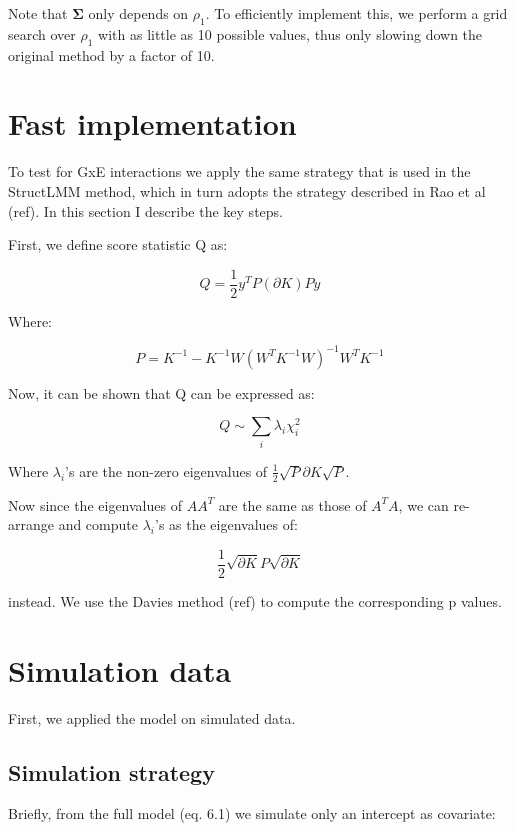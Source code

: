 Note that $\boldsymbol{\Sigma}$ only depends on $\rho_1$. 
To efficiently implement this, we perform a grid search over $\rho_1$ with as little as 10 possible values, thus only slowing down the original method by a factor of 10.

\section{Fast implementation}

To test for GxE interactions we apply the same strategy that is used in the StructLMM method, which in turn adopts the strategy described in Rao et al (ref).
In this section I describe the key steps.

First, we define score statistic Q as:

\begin{equation}
    Q = \frac{1}{2}y^TP (\partial K)P y 
\end{equation}

Where:

\begin{equation}
    P = K^{-1}-K^{-1}W(W^TK^{-1}W)^{-1}W^TK^{-1}
\end{equation}

Now, it can be shown that Q can be expressed as:

\begin{equation}
    Q \sim \sum_i \lambda_i \chi^2_i 
\end{equation}

Where $\lambda_i$'s are the non-zero eigenvalues of $\frac{1}{2}\sqrt{P} \partial K \sqrt{P}$.

Now since the eigenvalues of $AA^T$ are the same as those of $A^TA$, we can re-arrange and compute $\lambda_i$'s as the eigenvalues of:

\begin{equation}
    \frac{1}{2}\sqrt{\partial K} P \sqrt{\partial K}
\end{equation}

instead.
We use the Davies method (ref) to compute the corresponding p values.


\section{Simulation data}

First, we applied the model on simulated data.

\subsection{Simulation strategy}
Briefly, from the full model (eq. 6.1) we simulate only an intercept as covariate:  

